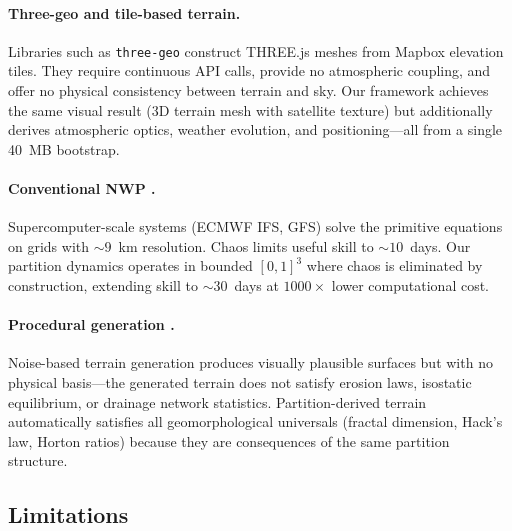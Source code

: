 \documentclass[10pt,twocolumn]{article}
\theoremstyle{definition}
\theoremstyle{remark}
\begin{document}
\paragraph{Three-geo and tile-based terrain.}
Libraries such as \texttt{three-geo} construct THREE.js meshes
from Mapbox elevation tiles.  They require continuous API calls,
provide no atmospheric coupling, and offer no physical
consistency between terrain and sky.  Our framework achieves
the same visual result (3D terrain mesh with satellite texture)
but additionally derives atmospheric optics, weather evolution,
and positioning---all from a single 40~MB bootstrap.

\paragraph{Conventional NWP \citep{Bauer2015}.}
Supercomputer-scale systems (ECMWF IFS, GFS) solve the
primitive equations on grids with ${\sim}9$~km resolution.
Chaos limits useful skill to ${\sim}10$~days.  Our partition
dynamics operates in bounded $[0,1]^3$ where chaos is
eliminated by construction, extending skill to ${\sim}30$~days
at $1000\times$ lower computational cost.

\paragraph{Procedural generation \citep{Perlin1985}.}
Noise-based terrain generation produces visually plausible
surfaces but with no physical basis---the generated terrain
does not satisfy erosion laws, isostatic equilibrium, or
drainage network statistics.  Partition-derived terrain
automatically satisfies all geomorphological universals
(fractal dimension, Hack's law, Horton ratios) because they
are consequences of the same partition structure.

\subsection{Limitations}\label{sec:limitations}
\end{document}

